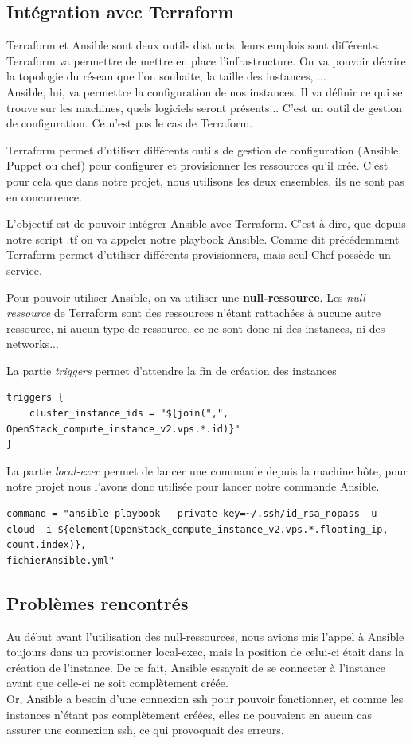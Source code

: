\documentclass[]{article}
\begin{document}
\subsection{Intégration avec Terraform}\label{intuxe9gration-avec-terraform}
Terraform et Ansible sont deux outils distincts, leurs emplois sont différents.\\
Terraform va permettre de mettre en place l'infrastructure. On va pouvoir décrire la topologie du réseau que l'on souhaite, la taille des instances, ... \\
Ansible, lui, va permettre la configuration de nos instances. Il va définir ce qui se trouve sur les machines, quels logiciels seront présents... C'est un outil de gestion de configuration. Ce n'est pas le cas de Terraform. 

Terraform permet d'utiliser différents outils de gestion de configuration (Ansible, Puppet ou chef) pour configurer et provisionner les ressources qu'il crée. C'est pour cela que dans notre projet, nous utilisons les deux ensembles, ils ne sont pas en concurrence. 

L'objectif est de pouvoir intégrer Ansible avec Terraform.
C'est-à-dire, que depuis notre script .tf on va appeler notre playbook Ansible. 
Comme dit précédemment Terraform permet d'utiliser différents provisionners, mais seul Chef possède un service. 

Pour pouvoir utiliser Ansible, on va utiliser une \textbf{null-ressource}. Les \textit{null-ressource} de Terraform sont des ressources n'étant rattachées à aucune autre ressource, ni aucun type de ressource, ce ne sont donc ni des instances, ni des networks...

La partie \textit{triggers} permet d'attendre la fin de création des instances
\begin{verbatim}
triggers { 
    cluster_instance_ids = "${join(",", OpenStack_compute_instance_v2.vps.*.id)}"
}
\end{verbatim}

La partie \textit{local-exec} permet de lancer une commande depuis la machine hôte, pour notre projet nous l'avons donc utilisée pour lancer notre commande Ansible.
\begin{verbatim}
command = "ansible-playbook --private-key=~/.ssh/id_rsa_nopass -u 
cloud -i ${element(OpenStack_compute_instance_v2.vps.*.floating_ip, count.index)},
fichierAnsible.yml"
\end{verbatim}

\subsection{Problèmes rencontrés}\label{probluxe8me-que-lon-a-eu}
Au début avant l'utilisation des null-ressources, nous avions mis l'appel à Ansible toujours dans un provisionner local-exec, mais la position de celui-ci était dans la création de l'instance. De ce fait, Ansible essayait de se connecter à l'instance avant que celle-ci ne soit complètement créée. \\ 
Or, Ansible a besoin d'une connexion ssh pour pouvoir fonctionner, et comme les instances
n'étant pas complètement créées, elles ne pouvaient en aucun cas
assurer une connexion ssh, ce qui provoquait des erreurs.
\end{document}
